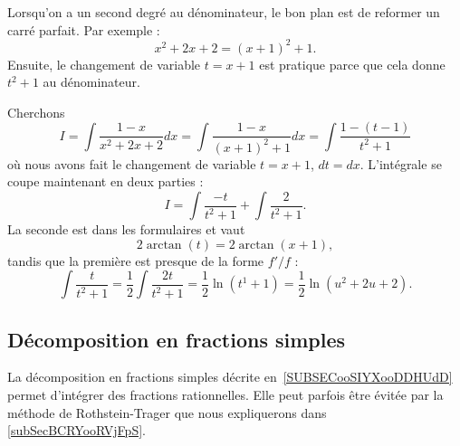 Lorsqu'on a un second degré au dénominateur, le bon plan est de reformer un carré parfait. Par exemple :
\begin{equation}
	x^2+2x+2=(x+1)^2+1.
\end{equation}
Ensuite, le changement de variable \( t=x+1\) est pratique parce que cela donne \( t^2+1\) au dénominateur.

Cherchons
\begin{equation}
	I=\int \frac{ 1-x }{ x^2+2x+2 }dx=\int\frac{ 1-x }{ (x+1)^2+1 }dx=\int\frac{ 1-(t-1) }{ t^2+1 }
\end{equation}
où nous avons fait le changement de variable \( t=x+1\), \( dt=dx\). L'intégrale se coupe maintenant en deux parties :
\begin{equation}
	I=\int\frac{ -t }{ t^2+1 }+\int \frac{ 2 }{ t^2+1 }.
\end{equation}
La seconde est dans les formulaires et vaut
\begin{equation}
	2\arctan(t)=2\arctan(x+1),
\end{equation}
tandis que la première est presque de la forme \( f'/f\) :
\begin{equation}
	\int\frac{ t }{ t^2+1 }=\frac{ 1 }{2}\int \frac{ 2t }{ t^2+1 }=\frac{ 1 }{2}\ln(t^1+1)=\frac{ 1 }{2}\ln(u^2+2u+2).
\end{equation}

\subsection{Décomposition en fractions simples}

La décomposition en fractions simples décrite en~\ref{SUBSECooSIYXooDDHUdD} permet d'intégrer des fractions rationnelles. Elle peut parfois être évitée par la méthode de Rothstein-Trager que nous expliquerons dans \ref{subSecBCRYooRVjFpS}.
